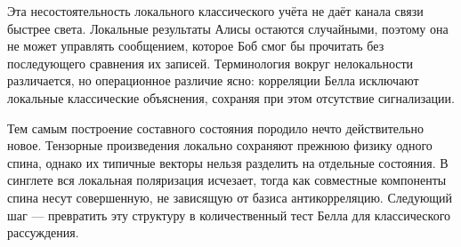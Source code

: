 Эта несостоятельность локального классического учёта не даёт канала связи быстрее света. Локальные результаты Алисы остаются случайными, поэтому она не может управлять сообщением, которое Боб смог бы прочитать без последующего сравнения их записей. Терминология вокруг нелокальности различается, но операционное различие ясно: корреляции Белла исключают локальные классические объяснения, сохраняя при этом отсутствие сигнализации.

Тем самым построение составного состояния породило нечто действительно новое. Тензорные произведения локально сохраняют прежнюю физику одного спина, однако их типичные векторы нельзя разделить на отдельные состояния. В синглете вся локальная поляризация исчезает, тогда как совместные компоненты спина несут совершенную, не зависящую от базиса антикорреляцию. Следующий шаг — превратить эту структуру в количественный тест Белла для классического рассуждения.
